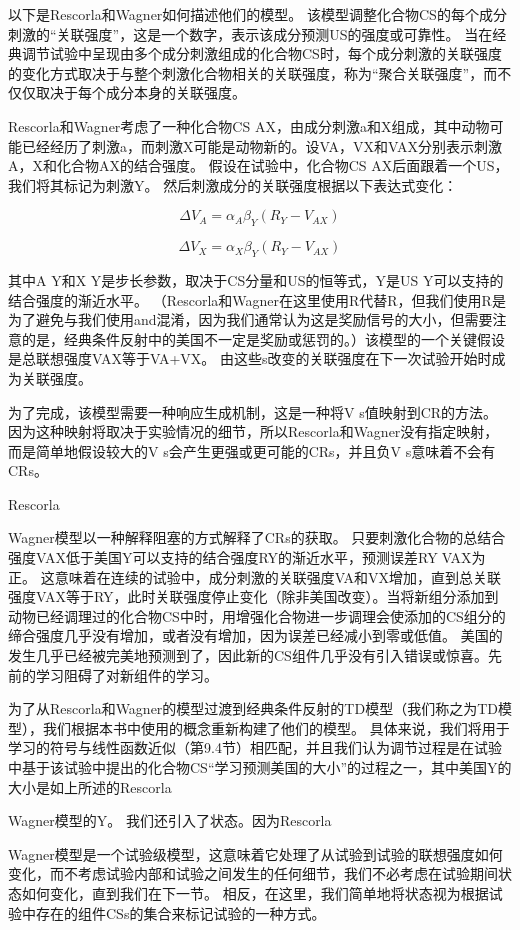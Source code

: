 {{{以下是Rescorla和Wagner如何描述他们的模型。
该模型调整化合物CS的每个成分刺激的“关联强度”，这是一个数字，表示该成分预测US的强度或可靠性。
当在经典调节试验中呈现由多个成分刺激组成的化合物CS时，每个成分刺激的关联强度的变化方式取决于与整个刺激化合物相关的关联强度，称为“聚合关联强度”，而不仅仅取决于每个成分本身的关联强度。


Rescorla和Wagner考虑了一种化合物CS AX，由成分刺激a和X组成，其中动物可能已经经历了刺激a，而刺激X可能是动物新的。设VA，VX和VAX分别表示刺激A，X和化合物AX的结合强度。
假设在试验中，化合物CS AX后面跟着一个US，我们将其标记为刺激Y。
然后刺激成分的关联强度根据以下表达式变化：

\begin{equation}
	\Delta V_A = \alpha_A \beta_Y
		(R_Y - V_{AX})
\end{equation}


\begin{equation}
	\Delta V_X = 
		\alpha_X \beta_Y
		(R_Y - V_{AX})
\end{equation}

其中A Y和X Y是步长参数，取决于CS分量和US的恒等式，Y是US Y可以支持的结合强度的渐近水平。
（Rescorla和Wagner在这里使用R代替R，但我们使用R是为了避免与我们使用and混淆，因为我们通常认为这是奖励信号的大小，但需要注意的是，经典条件反射中的美国不一定是奖励或惩罚的。）该模型的一个关键假设是总联想强度VAX等于VA+VX。
由这些s改变的关联强度在下一次试验开始时成为关联强度。


为了完成，该模型需要一种响应生成机制，这是一种将V s值映射到CR的方法。
因为这种映射将取决于实验情况的细节，所以Rescorla和Wagner没有指定映射，而是简单地假设较大的V s会产生更强或更可能的CRs，并且负V s意味着不会有CRs。


Rescorla{Wagner模型以一种解释阻塞的方式解释了CRs的获取。
只要刺激化合物的总结合强度VAX低于美国Y可以支持的结合强度RY的渐近水平，预测误差RY􀀀VAX为正。
这意味着在连续的试验中，成分刺激的关联强度VA和VX增加，直到总关联强度VAX等于RY，此时关联强度停止变化（除非美国改变）。当将新组分添加到动物已经调理过的化合物CS中时，用增强化合物进一步调理会使添加的CS组分的缔合强度几乎没有增加，或者没有增加，因为误差已经减小到零或低值。
美国的发生几乎已经被完美地预测到了，因此新的CS组件几乎没有引入错误或惊喜。先前的学习阻碍了对新组件的学习。


为了从Rescorla和Wagner的模型过渡到经典条件反射的TD模型（我们称之为TD模型），我们根据本书中使用的概念重新构建了他们的模型。
具体来说，我们将用于学习的符号与线性函数近似（第9.4节）相匹配，并且我们认为调节过程是在试验中基于该试验中提出的化合物CS“学习预测美国的大小”的过程之一，其中美国Y的大小是如上所述的Rescorla{Wagner模型的Y。
我们还引入了状态。因为Rescorla{Wagner模型是一个试验级模型，这意味着它处理了从试验到试验的联想强度如何变化，而不考虑试验内部和试验之间发生的任何细节，我们不必考虑在试验期间状态如何变化，直到我们在下一节。
相反，在这里，我们简单地将状态视为根据试验中存在的组件CSs的集合来标记试验的一种方式。


}}}}}}
